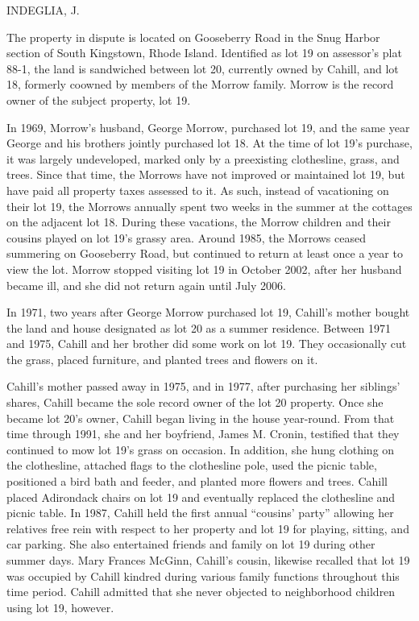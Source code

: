 
INDEGLIA, J.

The property in dispute is located on Gooseberry Road in the Snug Harbor section
of South Kingstown, Rhode Island. Identified as lot 19 on assessor's plat 88-1,
the land is sandwiched between lot 20, currently owned by Cahill, and lot 18,
formerly coowned by members of the Morrow family. Morrow is the record owner of
the subject property, lot 19.

In 1969, Morrow's husband, George Morrow, purchased lot 19, and the same year
George and his brothers jointly purchased lot 18. At the time of lot 19's
purchase, it was largely undeveloped, marked only by a preexisting clothesline,
grass, and trees. Since that time, the Morrows have not improved or maintained
lot 19, but have paid all property taxes assessed to it. As such, instead of
vacationing on their lot 19, the Morrows annually spent two weeks in the summer
at the cottages on the adjacent lot 18. During these vacations, the Morrow
children and their cousins played on lot 19's grassy area. Around 1985, the
Morrows ceased summering on Gooseberry
Road, but continued to return at least once a year
to view the lot. Morrow stopped visiting lot 19 in October 2002, after her
husband became ill, and she did not return again until July 2006.

In 1971, two years after George Morrow purchased lot 19, Cahill's mother bought
the land and house designated as lot 20 as a summer residence. Between 1971 and
1975, Cahill and her brother did some work on lot 19. They occasionally cut the
grass, placed furniture, and planted trees and flowers on it.

Cahill's mother passed away in 1975, and in 1977, after purchasing her siblings'
shares, Cahill became the sole record owner of the lot 20 property. Once she
became lot 20's owner, Cahill began living in the house year-round. From that
time through 1991, she and her boyfriend, James M. Cronin, testified that they
continued to mow lot 19's grass on occasion. In addition, she hung clothing on
the clothesline, attached flags to the clothesline pole, used the picnic table,
positioned a bird bath and feeder, and planted more flowers and trees. Cahill
placed Adirondack chairs on lot 19 and eventually replaced the clothesline and
picnic table. In 1987, Cahill held the first annual ``cousins' party'' allowing
her relatives free rein with respect to her property and lot 19 for playing,
sitting, and car parking. She also entertained friends and family on lot 19
during other summer days. Mary Frances McGinn, Cahill's cousin, likewise
recalled that lot 19 was occupied by Cahill kindred during various family
functions throughout this time period. Cahill admitted that she never objected
to neighborhood children using lot 19, however.


